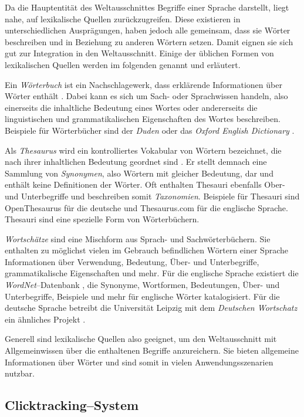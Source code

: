 Da die Hauptentität des Weltausschnittes Begriffe einer Sprache darstellt, liegt nahe, auf lexikalische Quellen zurückzugreifen. Diese existieren in unterschiedlichen Ausprägungen, haben jedoch alle gemeinsam, dass sie Wörter beschreiben und in Beziehung zu anderen Wörtern setzen. Damit eignen sie sich gut zur Integration in den Weltausschnitt. Einige der üblichen Formen von lexikalischen Quellen werden im folgenden genannt und erläutert.

Ein \emph{Wörterbuch} ist ein Nachschlagewerk, dass erklärende Informationen über Wörter enthält \cite{hk2003}. Dabei kann es sich um Sach- oder Sprachwissen handeln, also einerseits die inhaltliche Bedeutung eines Wortes oder andererseits die linguistischen und grammatikalischen Eigenschaften des Wortes beschreiben. Beispiele für Wörterbücher sind der \emph{Duden} \cite{duden} oder das \emph{Oxford English Dictionary} \cite{oed2010}.

Als \emph{Thesaurus} wird ein kontrolliertes Vokabular von Wörtern bezeichnet, die nach ihrer inhaltlichen Bedeutung geordnet sind \cite[S. 2]{ac2004}. Er stellt demnach eine Sammlung von \emph{Synonymen}, also Wörtern mit gleicher Bedeutung, dar und enthält keine Definitionen der Wörter. Oft enthalten Thesauri ebenfalls Ober- und Unterbegriffe und beschreiben somit \emph{Taxonomien}. Beispiele für Thesauri sind OpenThesaurus \cite{ot2013} für die deutsche und Thesaurus.com \cite{tc2013} für die englische Sprache. Thesauri sind eine spezielle Form von Wörterbüchern.

\emph{Wortschätze} sind eine Mischform aus Sprach- und Sachwörterbüchern. Sie enthalten zu möglichst vielen im Gebrauch befindlichen Wörtern einer Sprache Informationen über Verwendung, Bedeutung, Über- und Unterbegriffe, grammatikalische Eigenschaften und mehr.
Für die englische Sprache existiert die \emph{WordNet}--Datenbank \cite{wn2013, fc1998}, die Synonyme, Wortformen, Bedeutungen, Über- und Unterbegriffe, Beispiele und mehr für englische Wörter katalogisiert. Für die deutsche Sprache betreibt die Universität Leipzig mit dem \emph{Deutschen Wortschatz} ein ähnliches Projekt \cite{ws2013}.

Generell sind lexikalische Quellen also geeignet, um den Weltausschnitt mit Allgemeinwissen über die enthaltenen Begriffe anzureichern. Sie bieten allgemeine Informationen über Wörter und sind somit in vielen Anwendungsszenarien nutzbar.

\subsection{Clicktracking--System}


